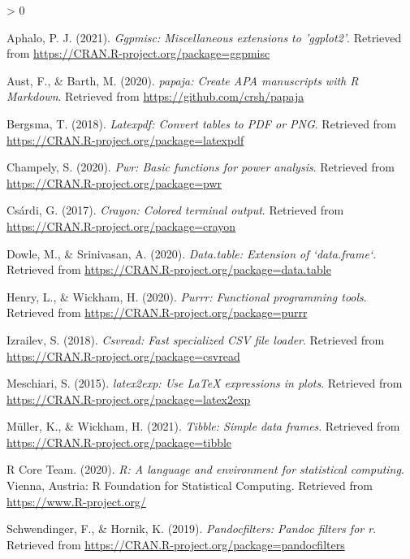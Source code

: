 \documentclass[
  english,
  man]{apa6}
\newlength{\cslhangindent}
\newenvironment{CSLReferences}[2] %
 {%
  \setlength{\parindent}{0pt}
  \ifodd #1 \everypar{\setlength{\hangindent}{\cslhangindent}}\ignorespaces\fi
  \ifnum #2 > 0
  \setlength{\parskip}{#2\baselineskip}
  \fi
 }%
 {}
\begin{document}
\hypertarget{refs}{}
\begin{CSLReferences}{1}{0}
\leavevmode\hypertarget{ref-R-ggpmisc}{}%
Aphalo, P. J. (2021). \emph{Ggpmisc: Miscellaneous extensions to 'ggplot2'}. Retrieved from \url{https://CRAN.R-project.org/package=ggpmisc}

\leavevmode\hypertarget{ref-R-papaja}{}%
Aust, F., \& Barth, M. (2020). \emph{{papaja}: {Create} {APA} manuscripts with {R Markdown}}. Retrieved from \url{https://github.com/crsh/papaja}

\leavevmode\hypertarget{ref-R-latexpdf}{}%
Bergsma, T. (2018). \emph{Latexpdf: Convert tables to PDF or PNG}. Retrieved from \url{https://CRAN.R-project.org/package=latexpdf}

\leavevmode\hypertarget{ref-R-pwr}{}%
Champely, S. (2020). \emph{Pwr: Basic functions for power analysis}. Retrieved from \url{https://CRAN.R-project.org/package=pwr}

\leavevmode\hypertarget{ref-R-crayon}{}%
Csárdi, G. (2017). \emph{Crayon: Colored terminal output}. Retrieved from \url{https://CRAN.R-project.org/package=crayon}

\leavevmode\hypertarget{ref-R-data.table}{}%
Dowle, M., \& Srinivasan, A. (2020). \emph{Data.table: Extension of `data.frame`}. Retrieved from \url{https://CRAN.R-project.org/package=data.table}

\leavevmode\hypertarget{ref-R-purrr}{}%
Henry, L., \& Wickham, H. (2020). \emph{Purrr: Functional programming tools}. Retrieved from \url{https://CRAN.R-project.org/package=purrr}

\leavevmode\hypertarget{ref-R-csvread}{}%
Izrailev, S. (2018). \emph{Csvread: Fast specialized CSV file loader}. Retrieved from \url{https://CRAN.R-project.org/package=csvread}

\leavevmode\hypertarget{ref-R-latex2exp}{}%
Meschiari, S. (2015). \emph{latex2exp: Use LaTeX expressions in plots}. Retrieved from \url{https://CRAN.R-project.org/package=latex2exp}

\leavevmode\hypertarget{ref-R-tibble}{}%
Müller, K., \& Wickham, H. (2021). \emph{Tibble: Simple data frames}. Retrieved from \url{https://CRAN.R-project.org/package=tibble}

\leavevmode\hypertarget{ref-R-base}{}%
R Core Team. (2020). \emph{R: A language and environment for statistical computing}. Vienna, Austria: R Foundation for Statistical Computing. Retrieved from \url{https://www.R-project.org/}

\leavevmode\hypertarget{ref-R-pandocfilters}{}%
Schwendinger, F., \& Hornik, K. (2019). \emph{Pandocfilters: Pandoc filters for r}. Retrieved from \url{https://CRAN.R-project.org/package=pandocfilters}


\end{CSLReferences}
\end{document}
